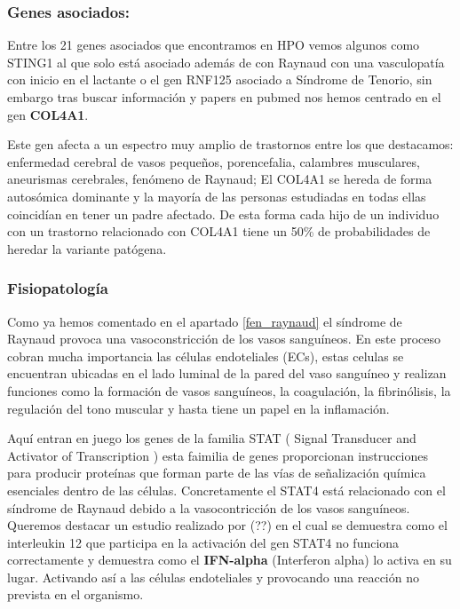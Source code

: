 \subsubsection{Genes asociados:}
\label{genes_asociados}
Entre los 21 genes asociados que encontramos en HPO vemos algunos como STING1 al que solo está asociado además de con Raynaud con una vasculopatía con inicio en el lactante o el gen RNF125 asociado a Síndrome de Tenorio, sin embargo tras buscar información y papers en pubmed nos hemos centrado en el gen \textbf{COL4A1}. \cite{Plaisier1993}

Este gen afecta a un espectro muy amplio de trastornos entre los que destacamos: enfermedad cerebral de vasos pequeños, porencefalia, calambres musculares, aneurismas cerebrales, fenómeno de Raynaud; El COL4A1 se hereda de forma autosómica dominante y la mayoría de las personas estudiadas en todas ellas coincidían en tener un padre afectado. De esta forma cada hijo de un individuo con un trastorno relacionado con COL4A1 tiene un 50\% de probabilidades de heredar la variante patógena.

\subsubsection{Fisiopatología}

Como ya hemos comentado en el apartado \ref{fen_raynaud} el síndrome de Raynaud provoca una vasoconstricción de los vasos sanguíneos. En este proceso cobran mucha importancia las células endoteliales (ECs), estas celulas se encuentran ubicadas en el lado luminal de la pared del vaso sanguíneo y realizan funciones como la formación de vasos sanguíneos, la coagulación, la fibrinólisis, la regulación del tono muscular y hasta tiene un papel en la inflamación. 

Aquí entran en juego los genes de la familia STAT ( Signal Transducer and Activator of Transcription ) esta faimilia de genes proporcionan instrucciones para producir proteínas que forman parte de las vías de señalización química esenciales dentro de las células. Concretamente el STAT4 está relacionado con el síndrome de Raynaud debido a la vasocontricción de los vasos sanguíneos. Queremos destacar un estudio realizado por (??) en el cual se demuestra como el interleukin 12 que participa en la activación del gen STAT4 no funciona correctamente y demuestra como el \textbf{IFN-alpha} (Interferon alpha) lo activa en su lugar. Activando así a las células endoteliales y provocando una reacción no prevista en el organismo.

